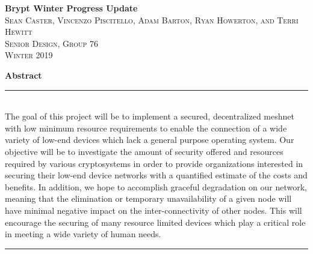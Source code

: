 \documentclass[tikz,a4paper,titlepage]{article}
\begin{document}
\begin{titlepage}
\vspace*{\fill}

\newcommand{\HRule}{\rule{\linewidth}{0.5mm}} %

\center %


{ \huge \bfseries Brypt Winter Progress Update}\\[0.4cm] %


\textsc{\LARGE Sean Caster, Vincenzo Piscitello, Adam Barton, Ryan Howerton, and Terri Hewitt}\\[0.5cm] %
\textsc{\Large Senior Design, Group 76}\\[0.5cm] %
\textsc{\large Winter 2019}\\[2.5cm] %

\begin{minipage}{0.8\textwidth}  %
\textbf{\large Abstract} \\
\HRule \\[0.4cm]
The goal of this project will be to implement a secured, decentralized meshnet with low minimum resource requirements to enable the connection of a wide variety of low-end devices which lack a general purpose operating system. Our objective will be to investigate the amount of security offered and resources required by various cryptosystems in order to provide organizations interested in securing their low-end device networks with a quantified estimate of the costs and benefits. In addition, we hope to accomplish graceful degradation on our network, meaning that the elimination or temporary unavailability of a given node will have minimal negative impact on the inter-connectivity of other nodes. This will encourage the securing of many resource limited devices which play a critical role in meeting a wide variety of human needs.
\\[0.4cm]
\HRule \\[1.5cm]
\end{minipage}


\end{titlepage}
\end{document}
